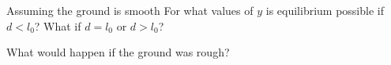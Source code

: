 {\begin{enumerate}
            Assuming the ground is smooth For what values of $y$ is
            equilibrium possible if $d < l_0$? What if $d = l_0$ or $d > l_0$?

            What would happen if the ground was rough?
    \end{enumerate}
}

